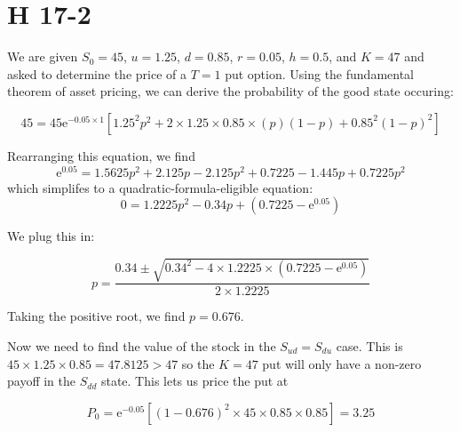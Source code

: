 \documentclass[12pt, letterpaper]{article}
\newcommand{\e}{\mathrm{e}}
\begin{document}
    \section{H 17-2}

    We are given \(S_0 = 45\), \(u = 1.25\), \(d = 0.85\), \(r = 0.05\), \(h = 0.5\), and \(K = 47\) and asked to determine the price of a \(T = 1\) put option. Using the fundamental theorem of asset pricing, we can derive the probability of the good state occuring:

    \[ 45 = 45 \e^{-0.05 \times 1} \left[ 1.25^2 p^2 + 2 \times 1.25 \times 0.85 \times (p)(1 - p) + 0.85^2 (1 - p)^2   \right]       \]

    Rearranging this equation, we find
    \[ \e^{0.05} = 1.5625 p^2 + 2.125 p - 2.125 p^2 + 0.7225 - 1.445 p + 0.7225 p^2   \]
    which simplifes to a quadratic-formula-eligible equation:
    \[ 0 = 1.2225 p^2 - 0.34 p + \left(0.7225 - \e^{0.05}\right)     \]

    We plug this in:

    \[ p = \frac{0.34 \pm \sqrt{0.34^2 - 4 \times 1.2225 \times (0.7225 - \e^{0.05})}}{2 \times 1.2225}   \]

    Taking the positive root, we find \(p = 0.676\). 

    Now we need to find the value of the stock in the \(S_{ud} = S_{du}\) case. This is \(45 \times 1.25 \times 0.85 = 47.8125 > 47\) so the \(K = 47\) put will only have a non-zero payoff in the \(S_{dd}\) state. This lets us price the put at

    \[ P_0 = \e^{-0.05} \left[ (1 - 0.676)^2 \times 45 \times 0.85 \times 0.85 \right] = 3.25    \]
\end{document}
